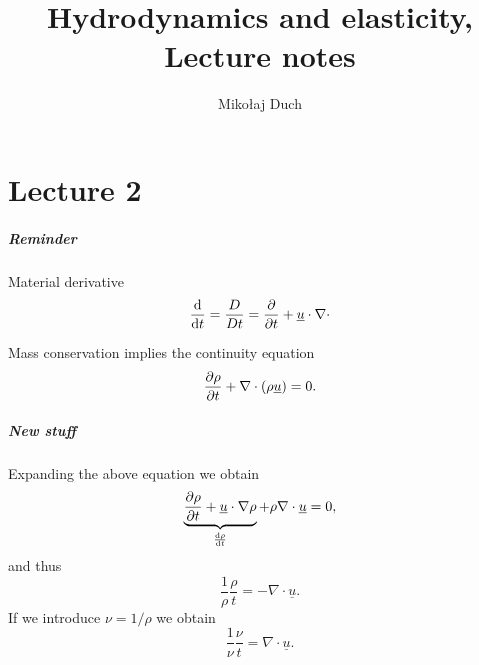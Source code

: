 \documentclass[11pt,oneside]{book}
\title{Hydrodynamics and elasticity,\\ Lecture notes}
\author{Mikołaj Duch}
\renewcommand{\vec}[1]{\underline{#1}}
\theoremstyle{definition} %
\theoremstyle{plain} %
\theoremstyle{remark} %
\theoremstyle{underline}
\begin{document}
  \maketitle
  \frontmatter


  \tableofcontents


  \mainmatter

  


  \chapter{Lecture 2}
  \paragraph{Reminder}
  Material derivative 
  \begin{displaymath}
    \dfrac{}{t} = \frac{D}{Dt} = \ptf{}{t} + \vec u \cdot \nabla \cdot
  \end{displaymath}

  Mass conservation implies the continuity equation
  \begin{displaymath}
    \ptf{\rho}{t} + \nabla \cdot ( \rho \vec u ) = 0.
  \end{displaymath}

  \paragraph{New stuff}
  Expanding the above equation we obtain
  \begin{displaymath}
    \underbrace{\ptf{\rho}{t} + \vec u \cdot \nabla \rho}_{\dfrac{\rho}{t}} + \rho \nabla \cdot \vec u = 0,
  \end{displaymath}
  and thus
  \begin{displaymath}
    \frac{1}{\rho} \dfrac{\rho}{t} = - \nabla \cdot \vec u.
  \end{displaymath}
  If we introduce  $\nu = 1 / \rho$ we obtain
  \begin{displaymath}
    \frac{1}{\nu} \dfrac{\nu}{t} = \nabla \cdot \vec u.
  \end{displaymath}
\end{document}
